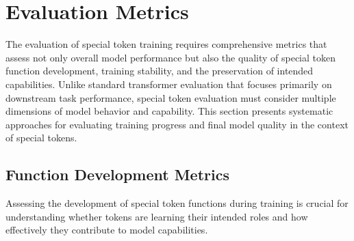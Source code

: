 
\section{Evaluation Metrics}

The evaluation of special token training requires comprehensive metrics that assess not only overall model performance but also the quality of special token function development, training stability, and the preservation of intended capabilities. Unlike standard transformer evaluation that focuses primarily on downstream task performance, special token evaluation must consider multiple dimensions of model behavior and capability. This section presents systematic approaches for evaluating training progress and final model quality in the context of special tokens.
\begin{comment}
Feedback: Before linking to the code, it's crucial to establish the conceptual framework for evaluation. For example: "Evaluating the training of special tokens goes beyond just checking the final loss. A robust evaluation framework should answer three key questions throughout the training process:
1.  **Is the token learning its job? (Functional Metrics)**: We need specific 'probe' tasks to measure if a token is actually learning its intended function. For a [CLS] token, this might be a linear probe to see how well its embedding can classify sentences.
2.  **Is the training process healthy? (Stability Metrics)**: We need to monitor the training dynamics. Are the gradients flowing to the special tokens correctly? Are their embedding norms stable, or are they exploding or vanishing?
3.  **Does it help the final task? (Downstream Metrics)**: Ultimately, the special token must improve performance on the final, downstream task. This is measured through standard evaluation metrics (e.g., accuracy, F1 score) and compared against a baseline model without the special token."
\end{comment}

\subsection{Function Development Metrics}

Assessing the development of special token functions during training is crucial for understanding whether tokens are learning their intended roles and how effectively they contribute to model capabilities.

